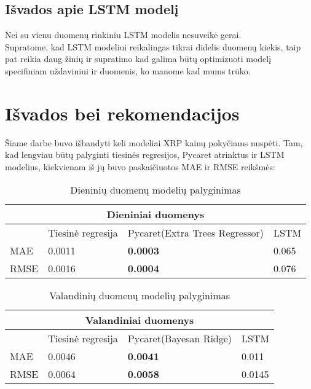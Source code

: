 \documentclass[12pt,a4paper]{article}
\begin{document}
\newpage

\subsection{Išvados apie LSTM modelį}
Nei su vienu duomenų rinkiniu LSTM modelis nesuveikė gerai. \\
Supratome, kad LSTM modeliui reikalingas tikrai didelis duomenų kiekis, taip pat reikia daug žinių ir supratimo kad galima būtų optimizuoti modelį specifiniam uždaviniui ir duomenis, ko manome kad mums trūko.

\newpage
\clearpage

\section{Išvados bei rekomendacijos}
Šiame darbe buvo išbandyti keli modeliai XRP kainų pokyčiams nuspėti. Tam, kad lengviau būtų palyginti tiesinės regresijos, Pycaret atrinktus ir LSTM modelius, kiekvienam iš jų buvo paskaičiuotos MAE ir RMSE reikšmės:

\begin{table}[h!]
\begin{center}
\caption{Dieninių duomenų modelių palyginimas}
\begin{tabular}{ |p{2cm}||p{3cm}|p{4cm}|p{3cm}|  }
 \hline
 \multicolumn{4}{|c|}{Dieniniai duomenys} \\
 \hline
 & Tiesinė regresija & Pycaret(Extra Trees Regressor) & LSTM \\
 \hline
 MAE & 0.0011 & \textbf{0.0003} & 0.065\\
 RMSE & 0.0016 & \textbf{0.0004} & 0.076\\
 \hline
\end{tabular}
\end{center}
\end{table}

\begin{table}[h!]
\begin{center}
\caption{Valandinių duomenų modelių palyginimas}
\begin{tabular}{ |p{2cm}||p{3cm}|p{4cm}|p{3cm}|  }
 \hline
 \multicolumn{4}{|c|}{Valandiniai duomenys} \\
 \hline
 & Tiesinė regresija & Pycaret(Bayesan Ridge) & LSTM \\
 \hline
 MAE & 0.0046 & \textbf{0.0041} & 0.011\\
 RMSE & 0.0064 & \textbf{0.0058} & 0.0145\\
 \hline
\end{tabular}
\end{center}
\end{table}
\end{document}
